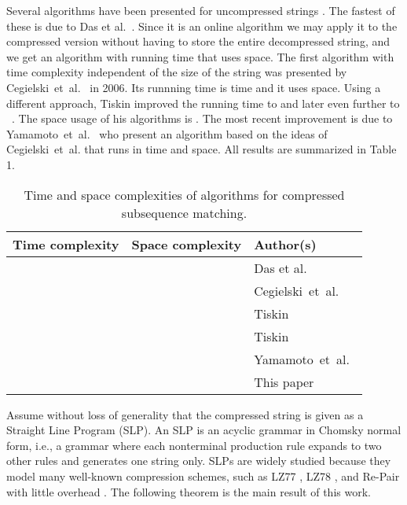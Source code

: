 \documentclass[11pt]{article}
\begin{document}
Several algorithms have been presented for uncompressed strings \cite{mannila1997discovery,das1997episode,boasson1999window,cegielski2006multiple,baeza1991searching,tronicek2001episode,crochemore2003directed}. The fastest of these is due to Das et al.~\cite{das1997episode}. Since it is an online algorithm we may apply it to the compressed version without having to store the entire decompressed string, and we get an algorithm with running time  that uses  space. The first algorithm with time complexity independent of the size of the string was presented by Cegielski~et~al.~\cite{cegielski2006window} in 2006. Its runnning time is  time and it uses  space. Using a different approach, Tiskin improved the running time to  \cite{tiskin2009faster} and later even further to ~\cite{tiskin2011towards}. The space usage of his algorithms is . The most recent improvement is due to Yamamoto~et~al.~\cite{yamamoto2011faster} who present an algorithm based on the ideas of Cegielski~et~al. that runs in  time and  space. All results are summarized in Table 1.

\begin{table}[h]\label{tab:results}
\begin{center}
\begin{tabular}{lll}
	\hline
	Time complexity & Space complexity & Author(s) \\
	\hline
	 &  & Das et al.~\cite{das1997episode} \\
	 &  & Cegielski~et~al.~\cite{cegielski2006window} \\
	 &  & Tiskin~\cite{tiskin2009faster} \\
	 &  & Tiskin~\cite{tiskin2011towards} \\
	 &  & Yamamoto~et~al.~\cite{yamamoto2011faster} \\
	\hline
	 & \multirow{2}{*}{} & \multirow{2}{*}{This paper} \\	
	 & & \\
	\hline
\end{tabular}
\caption{Time and space complexities of algorithms for compressed subsequence matching.}
\end{center}
\end{table}

\noindent Assume without loss of generality that the compressed string is given as a Straight Line Program (SLP). An SLP is an acyclic grammar in Chomsky normal form, i.e., a grammar where each nonterminal production rule expands to two other rules and  generates one string only. SLPs are widely studied because they model many well-known compression schemes, such as LZ77 \cite{lz77}, LZ78 \cite{lz78}, and Re-Pair \cite{larsson2000off}  with little overhead \cite{charikar2005smallest,rytter2003application}. The following theorem is the main result of this work.
\end{document}
